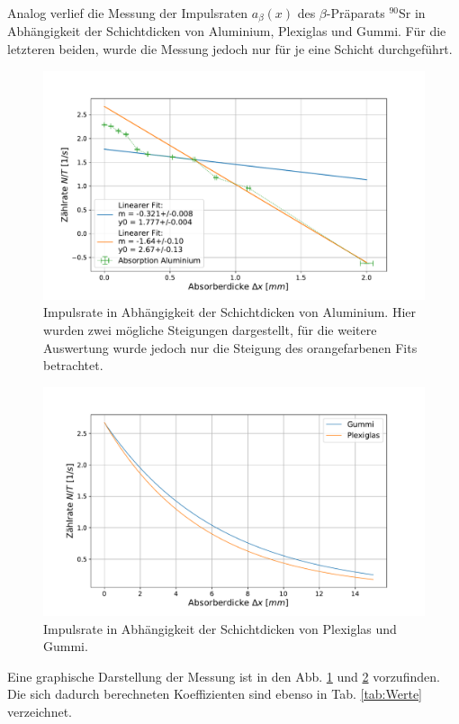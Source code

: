 	Analog verlief die Messung der Impulsraten $a_\beta (x)$ des $\beta$-Präparats $^{90}$Sr in Abhängigkeit der Schichtdicken von Aluminium, Plexiglas und Gummi.
	Für die letzteren beiden, wurde die Messung jedoch nur für je eine Schicht durchgeführt.
	\begin{figure}[ht]
		\centering
		\includegraphics[width=\textwidth]{data/BetaAbsorber.pdf}
		\caption{Impulsrate in Abhängigkeit der Schichtdicken von Aluminium. Hier wurden zwei mögliche Steigungen dargestellt, für die weitere Auswertung wurde jedoch nur die Steigung des orangefarbenen Fits betrachtet.}
		\label{fig:beta}	
	\end{figure}
	\begin{figure}[ht]
		\centering
		\includegraphics[width=\textwidth]{data/GummiPlexiAbsorber2.pdf}
		\caption{Impulsrate in Abhängigkeit der Schichtdicken von Plexiglas und Gummi.}
		\label{fig:beta2}	
	\end{figure}
	Eine graphische Darstellung der Messung ist in den Abb. \ref{fig:beta} und \ref{fig:beta2} vorzufinden. 
	Die sich dadurch berechneten Koeffizienten sind ebenso in Tab. \ref{tab:Werte} verzeichnet. 
	
